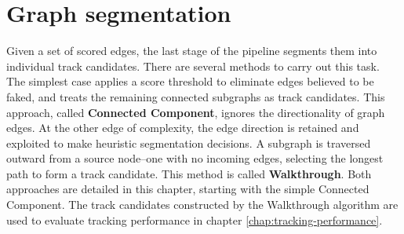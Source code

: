 \chapter{Graph segmentation}
\label{chap:track-building}

Given a set of scored edges, the last stage of the pipeline segments them into individual track candidates. 
There are several methods to carry out this task. 
The simplest case applies a score threshold to eliminate edges believed to be faked, and treats the remaining connected subgraphs as track candidates. 
This approach, called \textbf{Connected Component}, ignores the directionality of graph edges.
At the other edge of complexity, the edge direction is retained and exploited to make heuristic segmentation decisions. 
A subgraph is traversed outward from a source node--one with no incoming edges, selecting the longest path to form a track candidate.
This method is called \textbf{Walkthrough}. 
Both approaches are detailed in this chapter, starting with the simple Connected Component.
The track candidates constructed by the Walkthrough algorithm are used to evaluate tracking performance in chapter \ref{chap:tracking-performance}.

